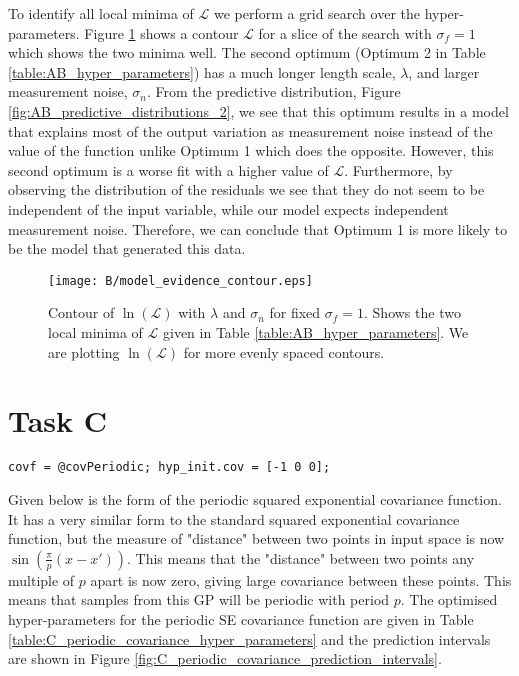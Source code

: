\documentclass[11pt]{article}
\newcommand{\Lik}{\mathcal{L}}
\begin{document}
To identify all local minima of $\Lik$ we perform a grid search over the hyper-parameters. Figure \ref{fig:B_marginal_liklihood_contour} shows a contour $\Lik$ for a slice of the search with $\sigma_f=1$ which shows the two minima well. The second optimum (Optimum 2 in Table \ref{table:AB_hyper_parameters}) has a much longer length scale, $\lambda$, and larger measurement noise, $\sigma_n$. From the predictive distribution, Figure \ref{fig:AB_predictive_distributions_2}, we see that this optimum results in a model that explains most of the output variation as measurement noise instead of the value of the function unlike Optimum 1 which does the opposite. However, this second optimum is a worse fit with a higher value of $\Lik$. Furthermore, by observing the distribution of the residuals we see that they do not seem to be independent of the input variable, while our model expects independent measurement noise. Therefore, we can conclude that Optimum 1 is more likely to be the model that generated this data. 

\begin{figure}[h]
    \centering
    \texttt{[image: B/model\_evidence\_contour.eps]}
    \caption{Contour of $\ln(\Lik)$ with $\lambda$ and $\sigma_n$ for fixed $\sigma_f = 1$. Shows the two local minima of $\Lik$ given in Table \ref{table:AB_hyper_parameters}. We are plotting $\ln(\Lik)$ for more evenly spaced contours.}
    \label{fig:B_marginal_liklihood_contour}
\end{figure}

\section{Task C}

\begin{lstlisting}[caption=Code to use periodic SE covariance. Training and prediction code same as Listing \ref{lst:A}, captionpos=b, basicstyle=\small, frame=tlrb]
covf = @covPeriodic; hyp_init.cov = [-1 0 0];
\end{lstlisting}
\label{lst:C}

Given below is the form of the periodic squared exponential covariance function. It has a very similar form to the standard squared exponential covariance function, but the measure of "distance" between two points in input space is now $\sin(\frac{\pi}{p}(x-x'))$. This means that the "distance" between two points any multiple of $p$ apart is now zero, giving large covariance between these points. This means that samples from this GP will be periodic with period $p$. The optimised hyper-parameters for the periodic SE covariance function are given in Table \ref{table:C_periodic_covariance_hyper_parameters} and the prediction intervals are shown in Figure \ref{fig:C_periodic_covariance_prediction_intervals}.
\end{document}
